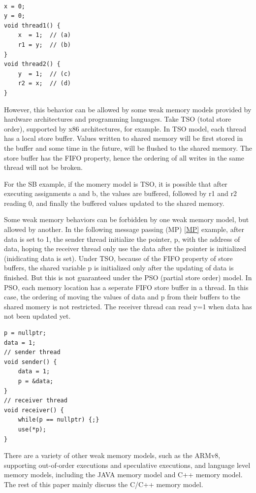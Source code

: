 \begin{lstlisting}[caption={SB}, label={SB}]

x = 0;
y = 0;
void thread1() {
    x  = 1;  // (a) 
    r1 = y;  // (b)
}
void thread2() {
    y  = 1;  // (c)
    r2 = x;  // (d)
}

\end{lstlisting}



However, this behavior can be allowed by some weak memory models provided by hardware architectures and programming languages. Take TSO (total store order)\cite{TSO}, supported by x86 architectures, for example. In TSO model, each thread has a local store buffer. Values written to shared memory will be first stored in the buffer and some time in the future, will be flushed to the shared memory. The store buffer has the FIFO property, hence the ordering of all writes in the same thread will not be broken.

For the SB example, if the momery model is TSO, it is possible that after executing assignments a and b, the values are buffered, followed by r1 and r2 reading 0, and finally the buffered values updated to the shared memory.

Some weak memory behaviors can be forbidden by one weak memory model, but allowed by another. In the following message passing (MP) \ref{MP} example, after data is set to 1, the sender thread initialize the pointer, p, with the address of data, hoping the receiver thread only use the data after the pointer is initialized (inidicating data is set). Under TSO, because of the FIFO property of store buffers, the shared variable p is initialized only after the updating of data is finished. But this is not guaranteed under the PSO (partial store order) model\cite{PSO}. In PSO, each memory location has a seperate FIFO store buffer in a thread. In this case, the ordering of moving the values of data and p from their buffers to the shared momery is not restricted. The receiver thread can read y=1 when data has not been updated yet.

\begin{lstlisting}[caption={MP}, label={MP}]
p = nullptr;
data = 1;
// sender thread
void sender() {
    data = 1;
    p = &data;
}
// receiver thread
void receiver() {
    while(p == nullptr) {;}
    use(*p);
}
\end{lstlisting}


There are a variety of other weak memory models, such as the ARMv8, supporting out-of-order executions and speculative executions, and language level memory models, including the JAVA memory model\cite{java} and C++ memory model. The rest of this paper mainly discuss the C/C++ memory model\cite{c++model}.



